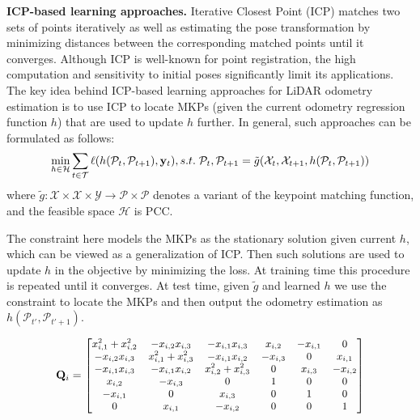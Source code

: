 \documentclass[sigconf]{acmart}
\def\lidar{LiDAR}
\newcommand{\bfsection}[1]{\vspace*{0.1cm}\noindent\textbf{#1.}}
\begin{document}
\bfsection{ICP-based learning approaches}
Iterative Closest Point (ICP) \cite{besl1992method} matches two sets of points iteratively as well as estimating the pose transformation by minimizing distances between the corresponding matched points until it converges. Although ICP is well-known for point registration, the high computation and sensitivity to initial poses significantly limit its applications. The key idea behind ICP-based learning approaches for \lidar{} odometry estimation is to use ICP to locate MKPs (given the current odometry regression function $h$) that are used to update $h$ further. In general, such approaches can be formulated as follows:
\begin{align}\label{eqn:ICP}
\small
    \min_{h\in\mathcal{H}} \sum_{t\in\mathcal{T}}\ell(h(\mathcal{P}_{t}, \mathcal{P}_{t+1}), \mathbf{y}_{t}), 
    s.t. \; \mathcal{P}_{t}, \mathcal{P}_{t+1} = \Tilde{g}(\mathcal{X}_{t}, \mathcal{X}_{t+1}, h(\mathcal{P}_{t}, \mathcal{P}_{t+1})) %
\end{align}
where $\tilde{g}:\mathcal{X}\times\mathcal{X}\times\mathcal{Y}\rightarrow\mathcal{P}\times\mathcal{P}$ denotes a variant of the keypoint matching function, and the feasible space $\mathcal{H}$ is PCC. 

The constraint here models the MKPs as the stationary solution given current $h$, which can be viewed as a generalization of ICP. Then such solutions are used to update $h$ in the objective by minimizing the loss. At training time this procedure is repeated until it converges. At test time, given $\tilde{g}$ and learned $h$ we use the constraint to locate the MKPs and then output the odometry estimation as $h(\mathcal{P}_{t'}, \mathcal{P}_{t'+1})$. %



\begin{align}\label{eqn:ICP_PQ}
\small
    \mathbf{Q}_i=
    \begin{bmatrix}
        x_{i,1}^2+x_{i,2}^2 & -x_{i,2}x_{i,3} & -x_{i,1}x_{i,3} & x_{i,2} & -x_{i,1} & 0 \\
        -x_{i,2}x_{i,3} & x_{i,1}^2+x_{i,3}^2 & -x_{i,1}x_{i,2} & -x_{i,3} & 0 & x_{i,1} \\
        -x_{i,1}x_{i,3} & -x_{i,1}x_{i,2} & x_{i,2}^2+x_{i,3}^2 & 0 & x_{i,3} & -x_{i,2} \\ 
        x_{i,2} & -x_{i,3} & 0 & 1 & 0 & 0 \\
        -x_{i,1} & 0 & x_{i,3} & 0 & 1 & 0 \\
        0 & x_{i,1} & -x_{i,2} & 0 & 0 & 1
    \end{bmatrix}
\end{align}
\end{document}
